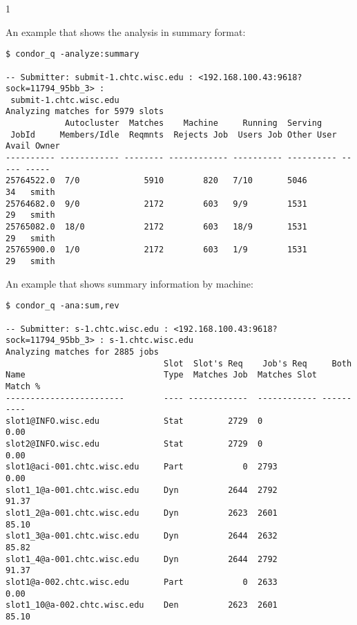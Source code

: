 \begin{ManPage}{\label{man-condor-q}}{1}






An example that shows the analysis in summary format:
\footnotesize
\begin{verbatim}
$ condor_q -analyze:summary

-- Submitter: submit-1.chtc.wisc.edu : <192.168.100.43:9618?sock=11794_95bb_3> :
 submit-1.chtc.wisc.edu
Analyzing matches for 5979 slots
            Autocluster  Matches    Machine     Running  Serving
 JobId     Members/Idle  Reqmnts  Rejects Job  Users Job Other User Avail Owner
---------- ------------ -------- ------------ ---------- ---------- ----- -----
25764522.0  7/0             5910        820   7/10       5046        34   smith
25764682.0  9/0             2172        603   9/9        1531        29   smith
25765082.0  18/0            2172        603   18/9       1531        29   smith
25765900.0  1/0             2172        603   1/9        1531        29   smith 
\end{verbatim}
\normalsize

An example that shows summary information by machine:
\footnotesize
\begin{verbatim}
$ condor_q -ana:sum,rev

-- Submitter: s-1.chtc.wisc.edu : <192.168.100.43:9618?sock=11794_95bb_3> : s-1.chtc.wisc.edu
Analyzing matches for 2885 jobs
                                Slot  Slot's Req    Job's Req     Both
Name                            Type  Matches Job  Matches Slot    Match %
------------------------        ---- ------------  ------------ ----------
slot1@INFO.wisc.edu             Stat         2729  0                  0.00
slot2@INFO.wisc.edu             Stat         2729  0                  0.00
slot1@aci-001.chtc.wisc.edu     Part            0  2793               0.00
slot1_1@a-001.chtc.wisc.edu     Dyn          2644  2792              91.37
slot1_2@a-001.chtc.wisc.edu     Dyn          2623  2601              85.10
slot1_3@a-001.chtc.wisc.edu     Dyn          2644  2632              85.82
slot1_4@a-001.chtc.wisc.edu     Dyn          2644  2792              91.37
slot1@a-002.chtc.wisc.edu       Part            0  2633               0.00
slot1_10@a-002.chtc.wisc.edu    Den          2623  2601              85.10 
\end{verbatim}
\normalsize


\end{ManPage}
